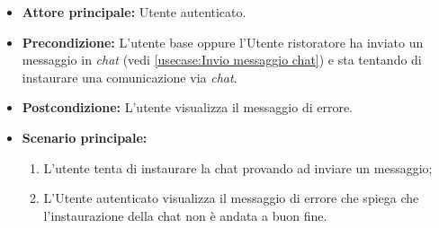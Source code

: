 \label{usecase:isualizzazione errore instaurazione chat}
\begin{itemize}
    \item \textbf{Attore principale:} Utente autenticato. 

	\item \textbf{Precondizione:}
	L'utente base oppure l'Utente ristoratore ha inviato un messaggio in \textit{chat} (vedi \autoref{usecase:Invio messaggio chat}) e sta tentando di instaurare una comunicazione via \textit{chat}.

	\item \textbf{Postcondizione:}
	      L'utente visualizza il messaggio di errore.

	\item \textbf{Scenario principale:}
	      \begin{enumerate}
		      \item L'utente tenta di instaurare la chat provando ad inviare un messaggio;
		      \item L'Utente autenticato visualizza il messaggio di errore che spiega che l'instaurazione della chat non è andata a buon fine.
	      \end{enumerate}
\end{itemize}